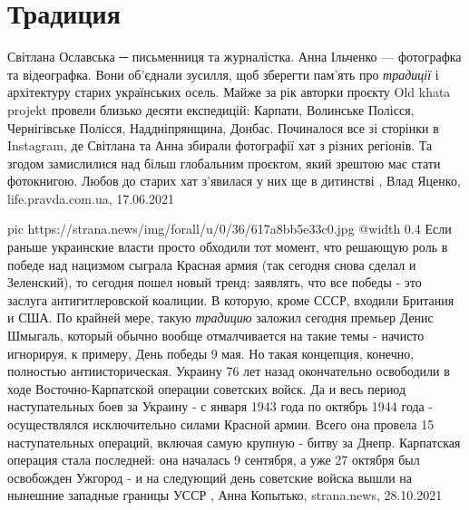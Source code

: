  
 
 
 
 
\chapter{Традиция}
\label{sec:slova.tradicia}

Світлана Ославська ─ письменниця та журналістка. Анна Ільченко — фотографка та
відеографка. Вони об’єднали зусилля, щоб зберегти пам’ять про \emph{традиції} і
архітектуру старих українських осель.  Майже за рік авторки проєкту Old khata
projekt провели близько десяти експедицій: Карпати, Волинське Полісся,
Чернігівське Полісся, Наддніпрянщина, Донбас.  Починалося все зі сторінки в
Instagram, де Світлана та Анна збирали фотографії хат з різних регіонів. Та
згодом замислилися над більш глобальним проєктом, який зрештою має стати
фотокнигою. Любов до старих хат з’явилася у них ще в дитинстві
, 
Влад Яценко, life.pravda.com.ua, 17.06.2021

\ifcmt
  pic https://strana.news/img/forall/u/0/36/617a8bb5e33c0.jpg
  @width 0.4
\fi
Если раньше украинские власти просто обходили тот момент, что решающую роль в
победе над нацизмом сыграла Красная армия (так сегодня снова сделал и
Зеленский), то сегодня пошел новый тренд: заявлять, что все победы - это
заслуга антигитлеровской коалиции. В которую, кроме СССР, входили Британия и
США.  По крайней мере, такую \emph{традицию} заложил сегодня премьер Денис Шмыгаль,
который обычно вообще отмалчивается на такие темы - начисто игнорируя, к
примеру, День победы 9 мая.  Но такая концепция, конечно, полностью
антиисторическая. Украину 76 лет назад окончательно освободили в ходе
Восточно-Карпатской операции советских войск. Да и весь период наступательных
боев за Украину - с января 1943 года по октябрь 1944 года - осуществлялся
исключительно силами Красной армии.  Всего она провела 15 наступательных
операций, включая самую крупную - битву за Днепр. Карпатская операция стала
последней: она началась 9 сентября, а уже 27 октября был освобожден Ужгород - и
на следующий день советские войска вышли на нынешние западные границы УССР
, 
Анна Копытько, strana.news, 28.10.2021

